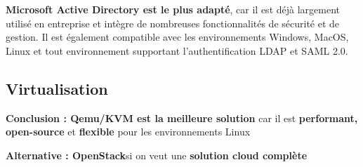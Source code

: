 \documentclass[../Livrable1.tex]{subfiles}
\begin{document}
\vspace{0.5cm}

\FloatBarrier
\textbf{Microsoft Active Directory est le plus adapté}, car il est déjà largement utilisé en entreprise et intègre de nombreuses fonctionnalités de sécurité et de gestion. Il est également compatible avec les environnements Windows, MacOS, Linux et tout environnement supportant l'authentification LDAP et SAML 2.0.

\subsection{Virtualisation}

\begin{table}[h]
    \centering
    \caption{Comparaison des solutions de virtualisation}
\end{table}

\vspace{0.5cm}

\textbf{Conclusion : Qemu/KVM est la meilleure solution} car il est \textbf{performant, open-source} et \textbf{flexible} pour les environnements Linux

\vspace{0.5cm}

\textbf{Alternative : OpenStack}si on veut une \textbf{solution cloud complète}
\end{document}
